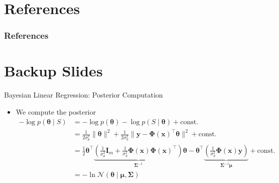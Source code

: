 \documentclass[aspectratio=169]{beamer}
\begin{document}
\section{References}

\begin{frame}[allowframebreaks]
  \frametitle{References}
  \nocite{*}
  
  
\end{frame}

\section{Backup Slides}

\begin{frame}{Bayesian Linear Regression: Posterior Computation}
  \begin{itemize}
    \item
      We compute the posterior
      \begin{equation*}
        \begin{split}
          -\log p(\bm{\theta} \mid S)
          &= -\log p(\bm{\theta}) - \log p(S \mid \bm{\theta}) + \text{const.}
          \\
          &= \frac{1}{2 \sigma_\theta^2} \| \bm{\theta} \|^2 + \frac{1}{2
          \sigma_\eta^2} \| \bm{y} - \mathbf{\Phi}(\bm{x})^\top \bm{\theta} \|^2
          + \text{const.}
          \\
          &= \frac{1}{2} \bm{\theta}^\top
          \underbrace{\left(\frac{1}{\sigma_\theta^2} \mathbf{I}_m +
          \frac{1}{\sigma_\eta^2} \mathbf{\Phi}(\bm{x})
          \mathbf{\Phi}(\bm{x})^\top\right)}_{\mathbf{\Sigma}^{-1}} \bm{\theta}
          - \bm{\theta}^\top \underbrace{\left(\frac{1}{\sigma_\eta^2}
          \mathbf{\Phi}(\bm{x}) \bm{y}\right)}_{\mathbf{\Sigma}^{-1} \bm{\mu}} +
          \text{const.}
          \\
          &= -\ln \mathcal{N}(\bm{\theta} \mid \bm{\mu}, \mathbf{\Sigma})
        \end{split}
      \end{equation*}
  \end{itemize}
\end{frame}
\end{document}
